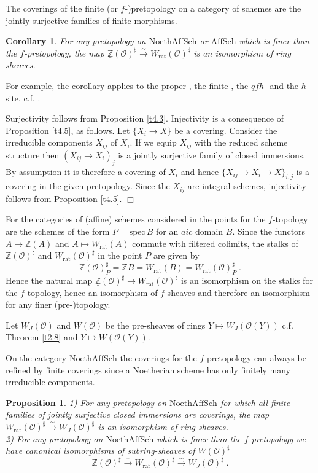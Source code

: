 \documentclass[12pt,leqno]{article}
\newcommand{\Z}{{\mathbb{Z}}}
\newcommand{\uZ}{\underline{\Z}}
\newcommand{\NAS}{\mathrm{NoethAffSch}}
\newcommand{\AS}{\mathrm{AffSch}}
\newcommand{\spec}{\mathrm{spec}\,}
\newcommand{\rat}{\mathrm{rat}}
\newcommand{\Oh}{{\mathcal O}}
\newcommand{\silo}{\stackrel{\sim}{\rightarrow}}
\newtheorem{prop}[theorem]{Proposition}
\newtheorem{cor}[theorem]{Corollary}
\newenvironment{rem}{\noindent {\bf Remark}}{}
\newenvironment{proof}{\noindent {\bf Proof}}{\mbox{}\hspace*{\fill}$\Box$}
\begin{document}
The coverings of the finite (or $f$-)pretopology on a category of schemes are the jointly surjective families of finite morphisms.

\begin{cor}
\label{t4.7}
For any pretopology on $\NAS$ or $\AS$ which is finer than the $f$-pretopology, the map $\uZ (\Oh)^{\sharp} \silo W_{\rat} (\Oh)^{\sharp}$ is an isomorphism of ring sheaves.
\end{cor}

For example, the corollary applies to the proper-, the finite-, the $qfh$- and the $h$-site, c.f. \cite[Definition 2.5]{GK}.

\begin{proof} Surjectivity follows from Proposition \ref{t4.3}. Injectivity is a consequence of Proposition \ref{t4.5}, as follows. Let $\{ X_i \to X \}$ be a covering. Consider the irreducible components $X_{ij}$ of $X_i$. If we equip $X_{ij}$ with the reduced scheme structure then $(X_{ij} \to X_i)_j$ is a jointly surjective family of closed immersions. By assumption it is therefore a covering of $X_i$ and hence $\{ X_{ij} \to X_i \to X \}_{i,j}$ is a covering in the given pretopology. Since the $X_{ij}$ are integral schemes, injectivity follows from Proposition \ref{t4.5}. 
\end{proof}

\begin{rem} For the categories of (affine) schemes considered in \cite[Lemma 3.2]{GK} the points for the $f$-topology are the schemes of the form $P = \spec B$ for an $aic$ domain $B$. Since the functors $A \mapsto \uZ (A)$ and $A \mapsto W_{\rat} (A)$ commute with filtered colimits, the stalks of $\uZ (\Oh)^{\sharp}$ and $W_{\rat} (\Oh)^{\sharp}$ in the point $P$ are given by
\[
\uZ (\Oh)^{\sharp}_P = \uZ B = W_{\rat} (B) = W_{\rat} (\Oh)^{\sharp}_P \; .
\]
Hence the natural map $\uZ (\Oh)^{\sharp} \to W_{\rat} (\Oh)^{\sharp}$ is an isomorphism on the stalks for the $f$-topology, hence an isomorphism of $f$-sheaves and therefore an isomorphism for any finer (pre-)topology.
\end{rem}

Let $W_J (\Oh)$ and $W (\Oh)$ be the pre-sheaves of rings $Y \mapsto W_J (\Oh (Y))$ c.f. Theorem \ref{t2.8} and $Y \mapsto W (\Oh (Y))$. 

On the category $\NAS$ the coverings for the $f$-pretopology can always be refined by finite coverings since a Noetherian scheme has only finitely many irreducible components. 

\begin{prop}
\label{t4.8}
1) For any pretopology on $\NAS$ for which all finite families of jointly surjective closed immersions are coverings, the map $W_{\rat} (\Oh)^{\sharp} \silo W_J (\Oh)^{\sharp}$ is an isomorphism of ring-sheaves.\\
2) For any pretopology on $\NAS$ which is finer than the $f$-pretopology we have canonical isomorphisms of subring-sheaves of $W (\Oh)^{\sharp}$
\[
\uZ (\Oh)^{\sharp} \silo W_{\rat} (\Oh)^{\sharp} \silo W_J (\Oh)^{\sharp} \; .
\]
\end{prop}
\end{document}
